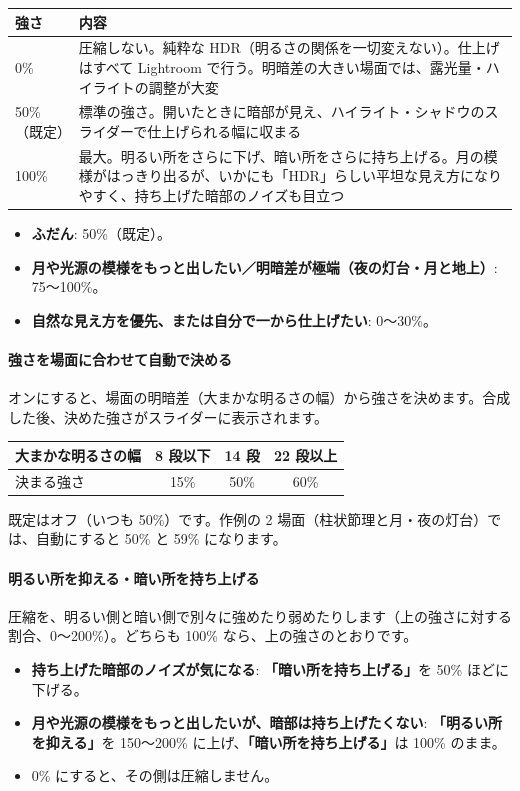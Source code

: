 \documentclass[paper=a4paper,fontsize=11pt,report,jafontsize=11pt]{jlreq}
\newcommand{\ui}[1]{\textsf{\textbf{「#1」}}}
\begin{document}
\begin{tabularx}{\linewidth}{l X}
\toprule
強さ & 内容 \\ \midrule
0\% & 圧縮しない。純粋な HDR（明るさの関係を一切変えない）。仕上げはすべて Lightroom で行う。明暗差の大きい場面では、露光量・ハイライトの調整が大変 \\
50\%（既定） & 標準の強さ。開いたときに暗部が見え、ハイライト・シャドウのスライダーで仕上げられる幅に収まる \\
100\% & 最大。明るい所をさらに下げ、暗い所をさらに持ち上げる。月の模様がはっきり出るが、いかにも「HDR」らしい平坦な見え方になりやすく、持ち上げた暗部のノイズも目立つ \\
\bottomrule
\end{tabularx}

\begin{tip}[変えるときの目安]
\begin{itemize}
  \item \textbf{ふだん}: 50\%（既定）。
  \item \textbf{月や光源の模様をもっと出したい／明暗差が極端（夜の灯台・月と地上）}: 75〜100\%。
  \item \textbf{自然な見え方を優先、または自分で一から仕上げたい}: 0〜30\%。
\end{itemize}
\end{tip}

\paragraph{強さを場面に合わせて自動で決める}
オンにすると、場面の明暗差（大まかな明るさの幅）から強さを決めます。合成した後、決めた強さがスライダーに表示されます。
\begin{center}
\begin{tabular}{lccc}
\toprule
大まかな明るさの幅 & 8 段以下 & 14 段 & 22 段以上 \\ \midrule
決まる強さ & 15\% & 50\% & 60\% \\
\bottomrule
\end{tabular}
\end{center}
既定はオフ（いつも 50\%）です。作例の 2 場面（柱状節理と月・夜の灯台）では、自動にすると 50\% と 59\% になります。

\paragraph{明るい所を抑える・暗い所を持ち上げる}
圧縮を、明るい側と暗い側で別々に強めたり弱めたりします（上の強さに対する割合、0〜200\%）。どちらも 100\% なら、上の強さのとおりです。
\begin{itemize}
  \item \textbf{持ち上げた暗部のノイズが気になる}: \ui{暗い所を持ち上げる}を 50\% ほどに下げる。
  \item \textbf{月や光源の模様をもっと出したいが、暗部は持ち上げたくない}: \ui{明るい所を抑える}を 150〜200\% に上げ、\ui{暗い所を持ち上げる}は 100\% のまま。
  \item 0\% にすると、その側は圧縮しません。
\end{itemize}
\end{document}
